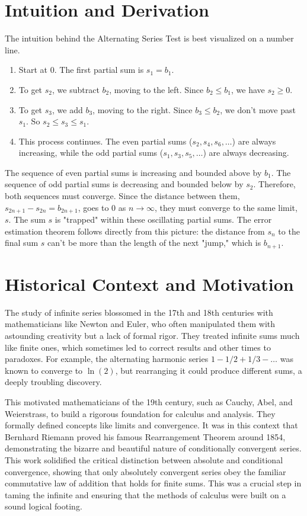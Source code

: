 \documentclass{article}
\begin{document}
\section{Intuition and Derivation}
The intuition behind the Alternating Series Test is best visualized on a number line.
\begin{enumerate}
    \item Start at 0. The first partial sum is $s_1 = b_1$.
    \item To get $s_2$, we subtract $b_2$, moving to the left. Since $b_2 \le b_1$, we have $s_2 \ge 0$.
    \item To get $s_3$, we add $b_3$, moving to the right. Since $b_3 \le b_2$, we don't move past $s_1$. So $s_2 \le s_3 \le s_1$.
    \item This process continues. The even partial sums ($s_2, s_4, s_6, \dots$) are always increasing, while the odd partial sums ($s_1, s_3, s_5, \dots$) are always decreasing.
\end{enumerate}
The sequence of even partial sums is increasing and bounded above by $b_1$. The sequence of odd partial sums is decreasing and bounded below by $s_2$. Therefore, both sequences must converge. Since the distance between them, $s_{2n+1} - s_{2n} = b_{2n+1}$, goes to 0 as $n \to \infty$, they must converge to the same limit, $s$. The sum $s$ is "trapped" within these oscillating partial sums. The error estimation theorem follows directly from this picture: the distance from $s_n$ to the final sum $s$ can't be more than the length of the next "jump," which is $b_{n+1}$.

\section{Historical Context and Motivation}
The study of infinite series blossomed in the 17th and 18th centuries with mathematicians like Newton and Euler, who often manipulated them with astounding creativity but a lack of formal rigor. They treated infinite sums much like finite ones, which sometimes led to correct results and other times to paradoxes. For example, the alternating harmonic series $1 - 1/2 + 1/3 - \dots$ was known to converge to $\ln(2)$, but rearranging it could produce different sums, a deeply troubling discovery.

This motivated mathematicians of the 19th century, such as Cauchy, Abel, and Weierstrass, to build a rigorous foundation for calculus and analysis. They formally defined concepts like limits and convergence. It was in this context that Bernhard Riemann proved his famous Rearrangement Theorem around 1854, demonstrating the bizarre and beautiful nature of conditionally convergent series. This work solidified the critical distinction between absolute and conditional convergence, showing that only absolutely convergent series obey the familiar commutative law of addition that holds for finite sums. This was a crucial step in taming the infinite and ensuring that the methods of calculus were built on a sound logical footing.
\end{document}
